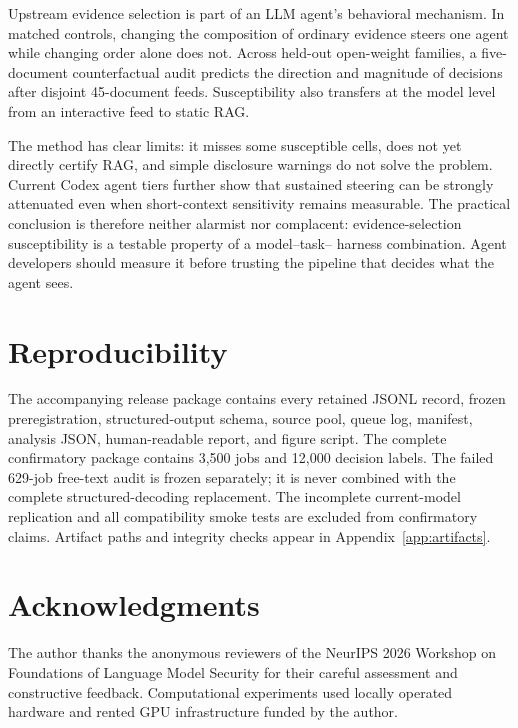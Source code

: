 \documentclass[11pt,letterpaper]{article}
\begin{document}
Upstream evidence selection is part of an LLM agent's behavioral mechanism.
In matched controls, changing the composition of ordinary evidence steers one
agent while changing order alone does not. Across held-out open-weight
families, a five-document counterfactual audit predicts the direction and
magnitude of decisions after disjoint 45-document feeds. Susceptibility also
transfers at the model level from an interactive feed to static RAG.

The method has clear limits: it misses some susceptible cells, does not yet
directly certify RAG, and simple disclosure warnings do not solve the problem.
Current Codex agent tiers further show that sustained steering can be strongly
attenuated even when short-context sensitivity remains measurable. The
practical conclusion is therefore neither alarmist nor complacent:
evidence-selection susceptibility is a testable property of a model--task--
harness combination. Agent developers should measure it before trusting the
pipeline that decides what the agent sees.

\section*{Reproducibility}

\begingroup
\sloppy
The accompanying release package contains every retained JSONL record, frozen preregistration,
structured-output schema, source pool, queue log, manifest, analysis JSON,
human-readable report, and figure script. The complete confirmatory package
contains 3,500 jobs and 12,000 decision labels. The failed 629-job free-text
audit is frozen separately; it is never combined with the complete
structured-decoding replacement. The incomplete current-model replication and
all compatibility smoke tests are excluded from confirmatory claims.
Artifact paths and integrity checks appear in Appendix~\ref{app:artifacts}.
\endgroup

\section*{Acknowledgments}

The author thanks the anonymous reviewers of the NeurIPS 2026 Workshop on
Foundations of Language Model Security for their careful assessment and
constructive feedback. Computational experiments used locally operated
hardware and rented GPU infrastructure funded by the author.
\end{document}
